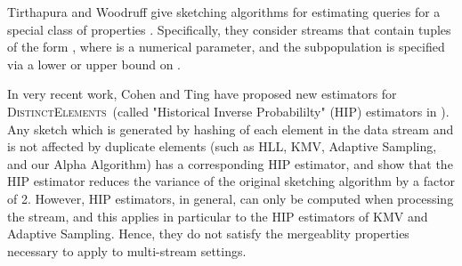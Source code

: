\documentclass{article}
\newcommand{\DistinctElements}{\textsc{DistinctElements}}
\begin{document}
Tirthapura and Woodruff \cite{finalcite} give sketching algorithms for estimating  queries
for a special class of properties . Specifically, they consider streams that contain tuples of the form , where 
is a numerical parameter, and the subpopulation  is specified via a lower or upper bound on . 

In very recent work, Cohen \cite{cohennew} and Ting \cite{ting} have proposed new estimators for \DistinctElements\ (called "Historical Inverse Probabililty" (HIP) estimators in \cite{cohennew}).
Any sketch which is generated by hashing of each element in the data stream and
is not affected by duplicate elements (such as HLL, KMV, Adaptive Sampling, and our Alpha Algorithm) has a corresponding HIP estimator, and \cite{cohennew, ting} show that the HIP estimator reduces the
variance of the original sketching algorithm by a factor of 2. However, HIP estimators, in general, can only be computed when processing the stream, and this applies
in particular to the HIP estimators of KMV and Adaptive Sampling. Hence, they do not satisfy the mergeablity properties necessary to apply to multi-stream settings. 
\end{document}
